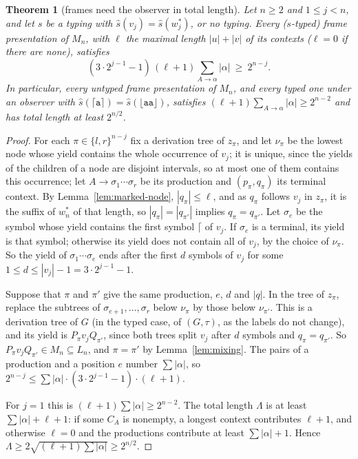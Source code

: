 \documentclass[11pt]{article}
\numberwithin{equation}{section}
\theoremstyle{plain}
\newtheorem{theorem}{Theorem}[section]
\theoremstyle{definition}
\theoremstyle{remark}
\theoremstyle{plain}
\newcommand{\Lfl}{\lfloor}
\newcommand{\Rfl}{\rfloor}
\newcommand{\Lce}{\lceil}
\newcommand{\Rce}{\rceil}
\newcommand{\ta}{\mathtt a}
\begin{document}
\begin{theorem}[frames need the observer in total length]\label{thm:frame-total}
Let $n\ge2$ and $1\le j<n$, and let $s$ be a typing with
$\widehat s(v_j)=\widehat s(w^*_j)$, or no typing.  Every ($s$-typed) frame
presentation of $M_n$, with $\ell$ the maximal length $|u|+|v|$ of its
contexts ($\ell=0$ if there are none), satisfies
\[
(3\cdot2^{j-1}-1)\,(\ell+1)\sum_{A\to\alpha}|\alpha|\ \ge\ 2^{n-j}.
\]
In particular, every untyped frame presentation of $M_n$, and every typed one
under an observer with $\widehat s(\Lce\ta\Rce)=\widehat s(\Lfl\ta\ta\Rfl)$,
satisfies $(\ell+1)\sum_{A\to\alpha}|\alpha|\ge2^{n-2}$ and has total length at
least $2^{n/2}$.
\end{theorem}
\begin{proof}
For each $\pi\in\{l,r\}^{n-j}$ fix a derivation tree of $z_\pi$, and let
$\nu_\pi$ be the lowest node whose yield contains the whole occurrence of
$v_j$; it is unique, since the yields of the children of a node are disjoint
intervals, so at most one of them contains this occurrence; let
$A\to\sigma_1\cdots\sigma_r$ be its production and $(p_\pi,q_\pi)$ its
terminal context.  By Lemma~\ref{lem:marked-node}, $|q_\pi|\le\ell$, and as
$q_\pi$ follows $v_j$ in $z_\pi$, it is the suffix of $w^*_n$ of that
length, so $|q_\pi|=|q_{\pi'}|$ implies $q_\pi=q_{\pi'}$.  Let $\sigma_e$ be the
symbol whose yield contains the first symbol $\Lce$ of $v_j$.  If $\sigma_e$
is a terminal, its yield is that symbol; otherwise its yield does not
contain all of $v_j$, by the choice of $\nu_\pi$.  So the yield of
$\sigma_1\cdots\sigma_e$ ends after the first $d$ symbols of $v_j$ for some
$1\le d\le|v_j|-1=3\cdot2^{j-1}-1$.

Suppose that $\pi$ and $\pi'$ give the same production, $e$, $d$ and $|q|$.
In the tree of $z_\pi$, replace the subtrees of $\sigma_{e+1},\dots,\sigma_r$
below $\nu_\pi$ by those below $\nu_{\pi'}$.  This is a derivation tree of
$G$ (in the typed case, of $(G,\tau)$, as the labels do not change), and its
yield is $P_\pi v_jQ_{\pi'}$, since both trees split $v_j$ after $d$ symbols
and $q_\pi=q_{\pi'}$.  So $P_\pi v_jQ_{\pi'}\in M_n\subseteq L_n$, and
$\pi=\pi'$ by Lemma~\ref{lem:mixing}.  The pairs of a production and a
position $e$ number $\sum|\alpha|$, so
$2^{n-j}\le\sum|\alpha|\cdot(3\cdot2^{j-1}-1)\cdot(\ell+1)$.

For $j=1$ this is $(\ell+1)\sum|\alpha|\ge2^{n-2}$.  The total length
$\Lambda$ is at least $\sum|\alpha|+\ell+1$: if some $C_A$ is nonempty, a
longest context contributes $\ell+1$, and otherwise $\ell=0$ and the
productions contribute at least $\sum|\alpha|+1$.  Hence
$\Lambda\ge2\sqrt{(\ell+1)\sum|\alpha|}\ge2^{n/2}$.
\end{proof}
\end{document}
